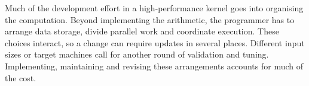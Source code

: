 Much of the development effort in a high-performance kernel goes into organising the computation. Beyond implementing the arithmetic, the programmer has to arrange data storage, divide parallel work and coordinate execution. These choices interact, so a change can require updates in several places. Different input sizes or target machines call for another round of validation and tuning. Implementing, maintaining and revising these arrangements accounts for much of the cost.
